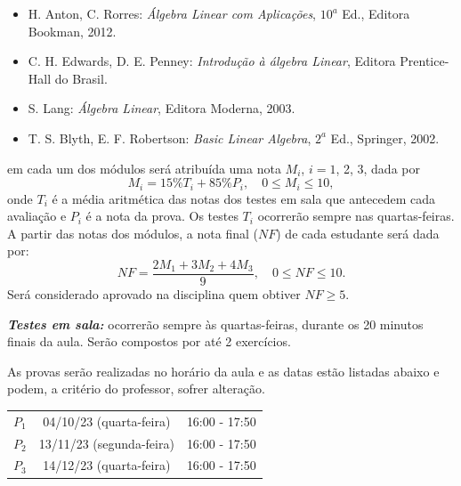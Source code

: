 \documentclass[12pt]{exam}
\begin{document}
\vspace{0.5cm}
\begin{itemize}


    \item H. Anton, C. Rorres: {\it Álgebra Linear com Aplicações}, $10^a$ Ed., Editora Bookman, 2012.

    \item C. H. Edwards, D. E. Penney: {\it Introdução à álgebra Linear}, Editora Prentice-Hall do Brasil.

    \item S. Lang: {\it Álgebra Linear}, Editora Moderna, 2003.

    \item T. S. Blyth, E. F. Robertson: {\it Basic Linear Algebra}, $2^a$ Ed., Springer, 2002.
\end{itemize}

 em cada um dos módulos será atribuída uma nota $M_i$, $i=1$, 2, 3, dada por
\[
    M_i = 15\%T_i + 85\%P_i, \quad 0 \le M_i \le 10,
\]
onde $T_i$ é a média aritmética das notas dos testes em sala que antecedem cada avaliação e $P_i$ é a nota da prova. Os testes $T_i$ ocorrerão sempre nas quartas-feiras.
A partir das notas dos módulos, a nota final ($NF$) de cada estudante será dada por:
\[
    NF = \dfrac{2M_1 + 3M_2 + 4M_3}{9}, \quad 0 \le NF \le 10.
\]
Será considerado aprovado na disciplina quem obtiver $NF \ge 5$.

\vspace{0.5cm}

\noindent \textbf{\textit{Testes em sala:}} ocorrerão sempre às quartas-feiras, durante os 20 minutos finais da aula. Serão compostos por até 2 exercícios.


As provas serão realizadas no horário da aula e as datas estão listadas abaixo e podem, a critério do professor, sofrer alteração.

\begin{center}
    \begin{tabular}{c|c|c}
        \hline\hline
        \hspace{1cm}{\bf Prova}\hspace{1cm} & \hspace{3cm}{\bf Data}\hspace{3cm} & \hspace{1.7cm}{\bf Horário}\hspace{1.7cm} \\
        \hline\hline
        $P_1$ & 04/10/23 (quarta-feira) \phantom{x} & 16:00 - 17:50 \\
        \hline
        $P_2$ & 13/11/23 (segunda-feira) \phantom{x} & 16:00 - 17:50 \\
        \hline
        $P_3$ & 14/12/23 (quarta-feira) \phantom{x} & 16:00 - 17:50 \\
        \hline\hline
    \end{tabular}
\end{center}
\end{document}
